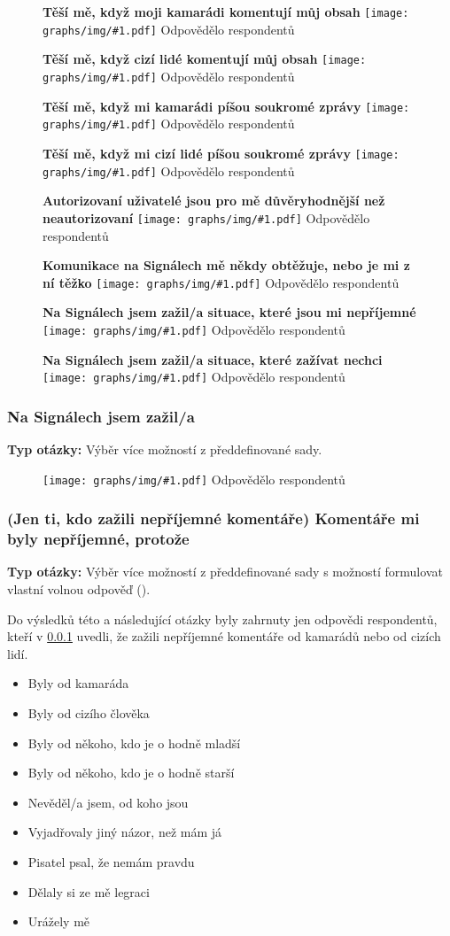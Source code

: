 \documentclass[12pt, a4paper, twoside]{article}
\newcommand{\answercount}[1]{Odpovědělo  respondentů}
\newcommand{\includegraph}[2]{
  \begin{figure}[H]
    \centering
    \textbf{#2}
    \texttt{[image: graphs/img/\#1.pdf]}
    \answercount{#1}
  \end{figure}
}
\newcommand{\qtype}{\textbf{Typ otázky:}
}
\newcommand{\pickMultiple}{Výběr více možností z předdefinované sady\xspace}
\newcommand{\withOther}{s možností formulovat vlastní volnou odpověď (\uv{Jiné})\xspace}
\begin{document}
\includegraph{ostatni_tesi_me_komentar_kamaradi}{Těší mě, když moji kamarádi komentují můj obsah}

\includegraph{ostatni_tesi_me_komentar_cizi}{Těší mě, když cizí lidé komentují můj obsah}

\includegraph{ostatni_tesi_me_zprava_kamaradi}{Těší mě, když mi kamarádi píšou soukromé zprávy}

\includegraph{ostatni_tesi_me_zprava_cizi}{Těší mě, když mi cizí lidé píšou soukromé zprávy}

\includegraph{ostatni_autorizovani_duveryhodnejsi}{Autorizovaní uživatelé jsou pro mě důvěryhodnější než neautorizovaní}

\includegraph{ostatni_neprijemne_komunikace_obtezuje}{Komunikace na Signálech mě někdy obtěžuje, nebo je mi z ní těžko}

\includegraph{ostatni_neprijemne_neprijemne_situace}{Na Signálech jsem zažil/a situace, které jsou mi nepříjemné}

\includegraph{ostatni_neprijemne_zazivat_nechci}{Na Signálech jsem zažil/a situace, které zažívat nechci}

\subsubsection{Na Signálech jsem zažil/a}\label{sec:neprijemneco}

\qtype \pickMultiple.

\includegraph{neprijemne_co}{}

\subsubsection{(Jen ti, kdo zažili nepříjemné komentáře) Komentáře mi byly nepříjemné, protože}

\qtype \pickMultiple \withOther.

Do výsledků této a následující otázky byly zahrnuty
jen odpovědi respondentů,
kteří v \ref{sec:neprijemneco} uvedli, že zažili nepříjemné komentáře
od kamarádů nebo od cizích lidí.

\begin{itemize}
\item Byly od kamaráda
\item Byly od cizího člověka
\item Byly od někoho, kdo je o hodně mladší
\item Byly od někoho, kdo je o hodně starší
\item Nevěděl/a jsem, od koho jsou
\item Vyjadřovaly jiný názor, než mám já
\item Pisatel psal, že nemám pravdu
\item Dělaly si ze mě legraci
\item Urážely mě
\end{itemize}
\end{document}
